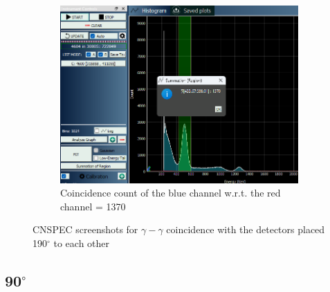 \begin{figure}[H]
    \ContinuedFloat
    

    \begin{subfigure}{\linewidth}
        \includegraphics[width=1\textwidth]{images/190/ccblue.png}
        \caption{Coincidence count of the blue channel w.r.t. the red channel = 1370}
    \end{subfigure}
    
    \caption{CNSPEC screenshots for $\gamma-\gamma$ coincidence with the detectors placed 190$^\circ$ to each other}
    \label{190}
\end{figure}

\subsection{90$^\circ$}

